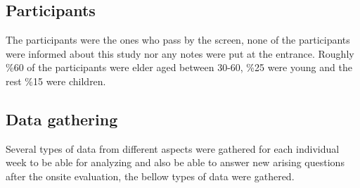 \subsection{Participants}
The participants were the ones who pass by the screen, none of the participants were informed about this study nor any notes were put at the entrance. Roughly \%60 of the participants were elder aged between 30-60, \%25 were young and the rest \%15 were children.


\subsection{Data gathering}
Several types of data from different aspects were gathered for each individual week to be able for analyzing and also be able to answer new arising questions after the onsite evaluation, the bellow types of data were gathered.


